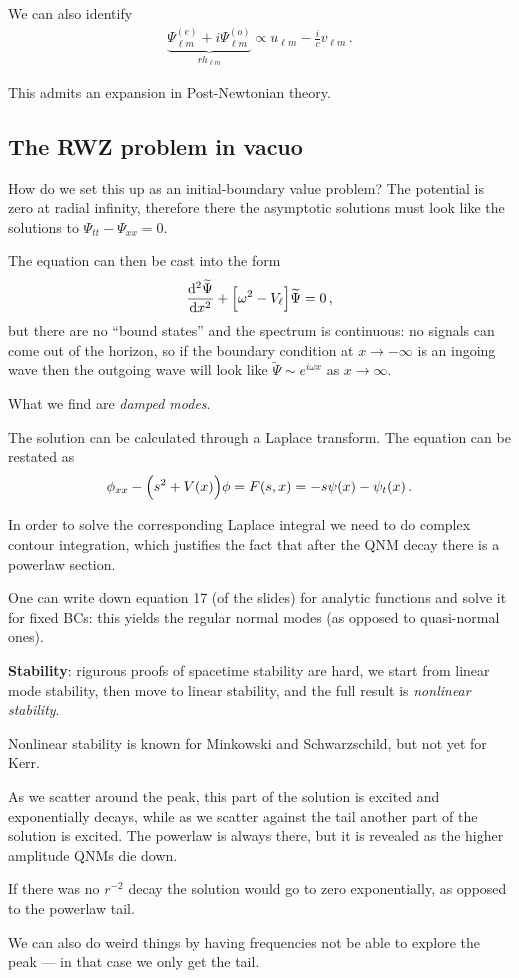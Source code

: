 \documentclass[main.tex]{subfiles}
\begin{document}
We can also identify 
%
\begin{align}
\underbrace{\Psi_{\ell m}^{(e)} + i \Psi_{\ell m}^{(o)}}_{r h_{\ell m}} \propto u_{\ell m} - \frac{i}{c} v_{\ell m}
\,.
\end{align}

This admits an expansion in Post-Newtonian theory. 

\subsection{The RWZ problem in vacuo}

How do we set this up as an initial-boundary value problem? 
The potential is zero at radial infinity, therefore there the asymptotic solutions must look like the solutions to \(\Psi_{tt} - \Psi_{xx} = 0\). 

The equation can then be cast into the form 
%
\begin{align}
\dv[2]{\widetilde{\Psi}}{x} + \qty[\omega^2 - V_\ell] \widetilde{\Psi} = 0
\,,
\end{align}
%
but there are no ``bound states'' and the spectrum is continuous: no signals can come out of the horizon, so if the boundary condition at \(x \to - \infty\) is an ingoing wave then the outgoing wave will look like \(\widetilde{\Psi} \sim e^{i \omega x}\) as \(x \to \infty \).

What we find are \emph{damped modes}. 

The solution can be calculated through a Laplace transform. 
The equation can be restated as 
%
\begin{align}
\phi_{xx} - \qty(s^2 + V(x)) \phi = F(s, x) = - s \psi (x) - \psi_t (x)
\,.
\end{align}

In order to solve the corresponding Laplace integral we need to do complex contour integration, which justifies the fact that after the QNM decay there is a powerlaw section. 

One can write down equation 17 (of the slides) for analytic functions and solve it for fixed BCs: this yields the regular normal modes (as opposed to quasi-normal ones).

\textbf{Stability}: rigurous proofs of spacetime stability are hard, we start from linear mode stability, then move to linear stability, and the full result is \emph{nonlinear stability}. 

Nonlinear stability is known for Minkowski and Schwarzschild, but not yet for Kerr. 

As we scatter around the peak, this part of the solution is excited and exponentially decays, while as we scatter against the tail another part of the solution is excited. 
The powerlaw is always there, but it is revealed as the higher amplitude QNMs die down. 

If there was no \(r^{-2}\) decay the solution would go to zero exponentially, as opposed to the powerlaw tail.

We can also do weird things by having frequencies not be able to explore the peak --- in that case we only get the tail. 
\end{document}
